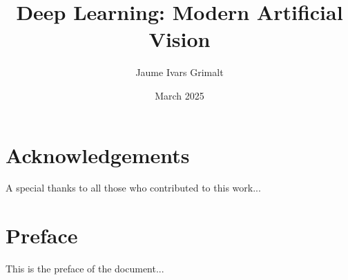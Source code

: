 

\title{Deep Learning: Modern Artificial Vision}
\author{Jaume Ivars Grimalt }
\date{March 2025}




\maketitle

\tableofcontents %

\chapter*{Acknowledgements}
A special thanks to all those who contributed to this work...

\chapter*{Preface}
This is the preface of the document...
\newpage
{} %











